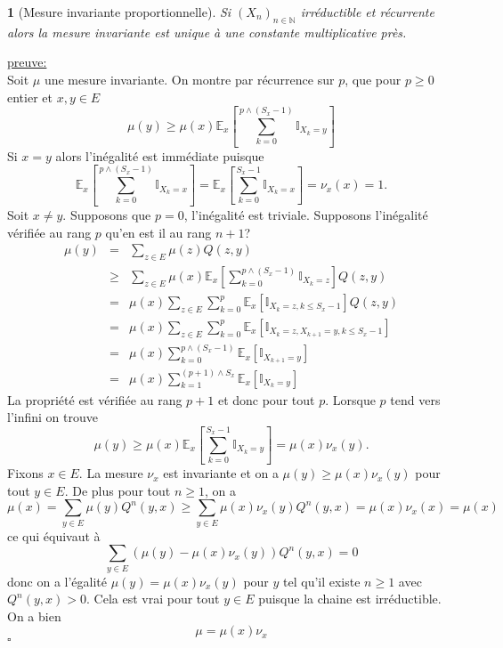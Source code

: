 \documentclass[8pt,notheorems]{beamer}
\def \E{\mathbb E}
\def \N{\mathbb N}
\newtheorem{theorem}{\translate{Theorem}}[section]
\newtheorem{theorem}{\translate{Theoreme}}
\theoremstyle{definition}
\theoremstyle{example}
\theoremstyle{mystyle}
\theoremstyle{plain}
\begin{document}
\begin{frame}[allowframebreaks]
\begin{theorem}[Mesure invariante proportionnelle]\label{theo:mesure_invariante_proportionnelle}
Si $(X_n)_{n\in \N}$ irréductible et récurrente alors la mesure invariante est unique à une constante multiplicative près.
\end{theorem}
\underline{preuve:}\\
Soit  $\mu$ une mesure invariante. On montre par récurrence sur $p$, que pour $p\geq 0$ entier et $x,y\in E$
$$
\mu(y)\geq \mu(x)\E_x\left[\sum_{k = 0}^{p\land (S_x -1)}\mathbb{I}_{X_k = y}\right]
$$
Si $x = y$ alors l'inégalité est immédiate puisque
$$
\E_x\left[\sum_{k = 0}^{p\land (S_x -1)}\mathbb{I}_{X_k = x}\right] = \E_x\left[\sum_{k = 0}^{S_x -1}\mathbb{I}_{X_k = x}\right]  = \nu_x(x) = 1.
$$
Soit $x \neq y$. Supposons que  $p = 0$, l'inégalité est triviale. Supposons l'inégalité vérifiée au rang $p$ qu'en est il au rang $n+1$?
\begin{eqnarray*}
\mu(y) &=& \sum_{z \in E}\mu(z)Q(z,y)\\
       &\geq& \sum_{z \in E}\mu(x)\E_x\left[\sum_{k = 0}^{p\land (S_x -1)}\mathbb{I}_{X_k = z}\right] Q(z,y)\\
       &=& \mu(x)\sum_{z \in E}\sum_{k = 0}^{p}\E_x\left[\mathbb{I}_{X_k = z, k\leq S_x - 1}\right] Q(z,y)\\
       &=& \mu(x)\sum_{z \in E}\sum_{k = 0}^{p}\E_x\left[\mathbb{I}_{X_k = z, X_{k+1} = y,  k\leq S_x - 1}\right]\\
       &=& \mu(x)\sum_{k = 0}^{p\land (S_x-1)}\E_x\left[\mathbb{I}_{X_{k+1} = y}\right]\\
       &=& \mu(x)\sum_{k = 1}^{(p+1)\land S_x}\E_x\left[\mathbb{I}_{ X_{k} = y}\right]
\end{eqnarray*}
La propriété est vérifiée au rang $p+ 1$ et donc pour tout $p$. Lorsque $p$ tend vers l'infini  on trouve
$$
\mu(y)\geq \mu(x)\E_x\left[\sum_{k = 0}^{S_x -1}\mathbb{I}_{X_k = y}\right] = \mu(x)\nu_x(y).
$$
Fixons $x\in E$. La mesure $\nu_x$ est invariante et on a $\mu(y)\geq \mu(x)\nu_x(y)$ pour tout $y\in E$.
De plus pour tout $n\geq 1$, on a
$$
\mu(x) = \sum_{y\in E}\mu(y)Q^{n}(y,x)\geq \sum_{y\in E}\mu(x)\nu_x(y)Q^n(y,x)=\mu(x)\nu_x(x)=\mu(x)
$$
ce qui équivaut à
$$
\sum_{y\in E}(\mu(y)- \mu(x)\nu_x(y))Q^{n}(y,x)=0
$$
donc on a l'égalité $\mu(y)= \mu(x)\nu_x(y)$ pour $y$ tel qu'il existe $n\geq 1$ avec $Q^n(y,x)>0$. Cela est vrai pour tout $y\in E$ puisque la chaine est irréductible. On a bien
$$
\mu = \mu(x)\nu_x
$$
$\square$
\end{frame}
\end{document}

